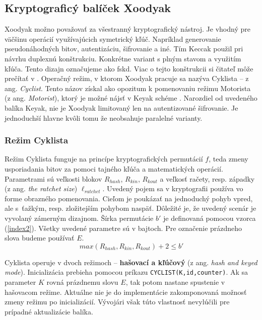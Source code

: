 \subsection{Kryptograficý balíček Xoodyak} 
Xoodyak možno považovať za všestranný kryptografický nástroj. Je vhodný pre väčšinu operácií využívajúcich symetrický kľúč. Napríklad generovanie pseudonáhodných bitov, autentizáciu, šifrovanie a iné. Tím Keccak použil pri návrhu duplexnú konštrukciu. Konkrétne variant s plným stavom a využitím kľúča. Tento dizajn označujeme ako \acrfull{fskd}. Viac o tejto konštrukcii si čitateľ môže prečítať v \cite{duplex}.
Operačný režim, v ktorom Xoodyak pracuje sa nazýva Cyklista -- z ang. \textit{Cyclist}. Tento názov získal ako opozitum k pomenovaniu režimu Motorista (z ang. \textit{Motorist}), ktorý je možné nájsť v Keyak schéme \cite{keyak}. Narozdiel od uvedeného balíka Keyak, nie je Xoodyak limitovaný len na autentizované šifrovanie. Je jednoduchší hlavne kvôli tomu že neobsahuje paralelné varianty.

\subsubsection{Režim Cyklista}\label{cyklista}
Režim Cyklista funguje na princípe kryptografických permutácií $f$, teda zmeny usporiadania bitov za pomoci tajného kľúča a matematických operácií. Parametrami sú veľkosti blokov $R_{hash}$, $R_{kin}$, $R_{kout}$ a veľkosť račety, resp. západky (z ang. \textit{the ratchet size}) \cite{ratchet} $\ell_{ratchet}$. Uvedený pojem sa v kryptografii používa vo forme obrazného pomenovania. Cieľom je poukázať na jednoduchý pohyb vpred, ale s~ťažkým, resp. zložitejším pohybom naspäť. Dôležité je, že uvedený scenár je vyvolaný zámerným dizajnom. Šírka permutácie $b'$ je definovaná pomocou vzorca (\ref{index2}). Všetky uvedené parametre sú v bajtoch. Pre označenie prázdneho slova budeme používať $E$.
\begin{equation}\label{index2}
	max(R_{hash}, R_{kin}, R_{kout}) + 2 \leq b'
\end{equation} 

Cyklista operuje v dvoch režimoch -- \textbf{hašovací a kľúčový} (z ang. \textit{hash and keyed mode}). 
Inicializácia prebieha pomocou príkazu \lstinline|CYCLIST(K,id,counter)|. Ak sa parameter $K$ rovná prázdnemu slovu $E$, tak potom nastane spustenie v hašovacom režime. Aktuálne nie je do implementácie zakomponovaná možnosť zmeny režimu po inicializácií. Vývojári však túto vlastnosť nevylúčili pre prípadné aktualizácie balíka.  


